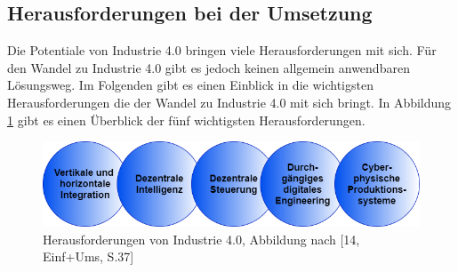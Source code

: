 \subsection{Herausforderungen bei der Umsetzung}\label{sec:HerausforderungenUmsetzung}
Die Potentiale von Industrie 4.0 bringen viele Herausforderungen mit sich. Für den Wandel zu Industrie 4.0 gibt es jedoch keinen allgemein anwendbaren Lösungsweg. Im Folgenden gibt es einen Einblick in die wichtigsten Herausforderungen die der Wandel zu Industrie 4.0 mit sich bringt. In Abbildung \ref{fig:HerausforderungenIndustrie4.0} gibt es einen Überblick der fünf wichtigsten Herausforderungen.
\begin{figure}[h]
	\centering
	\includegraphics[width=1\linewidth]{Bilder/A11_HerausforderungenIndustrie4}
	\caption{Herausforderungen von Industrie 4.0, Abbildung nach [14, Einf+Ums, S.37]}
	\label{fig:HerausforderungenIndustrie4.0}
\end{figure}

